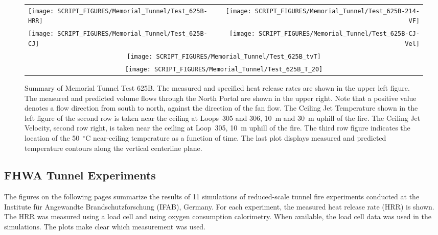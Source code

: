 \begin{figure}[p]
\begin{tabular*}{\textwidth}{l@{\extracolsep{\fill}}r}
\texttt{[image: SCRIPT\_FIGURES/Memorial\_Tunnel/Test\_625B-HRR]} &
\texttt{[image: SCRIPT\_FIGURES/Memorial\_Tunnel/Test\_625B-214-VF]} \\
\texttt{[image: SCRIPT\_FIGURES/Memorial\_Tunnel/Test\_625B-CJ]} &
\texttt{[image: SCRIPT\_FIGURES/Memorial\_Tunnel/Test\_625B-CJ-Vel]} \\
\multicolumn{2}{c}{\texttt{[image: SCRIPT\_FIGURES/Memorial\_Tunnel/Test\_625B\_tvT]}} \\
\multicolumn{2}{c}{\texttt{[image: SCRIPT\_FIGURES/Memorial\_Tunnel/Test\_625B\_T\_20]}}
\end{tabular*}
\caption[Summary of Memorial Tunnel Test 625B]{Summary of Memorial Tunnel Test 625B. The measured and specified heat release rates are shown in the upper left figure. The measured and predicted volume flows through the North Portal are shown in the upper right. Note that a positive value denotes a flow direction from south to north, against the direction of the fan flow. The Ceiling Jet Temperature shown in the left figure of the second row is taken near the ceiling at Loops~305 and 306, 10~m and 30~m uphill of the fire. The Ceiling Jet Velocity, second row right, is taken near the ceiling at Loop~305, 10~m uphill of the fire. The third row figure indicates the location of the 50~$^\circ$C near-ceiling temperature as a function of time. The last plot displays measured and predicted temperature contours along the vertical centerline plane.}
\label{Memorial_Tunnel_625B}
\end{figure}


\clearpage

\subsection{FHWA Tunnel Experiments}
\label{FHWA_Tunnel_Results}

The figures on the following pages summarize the results of 11 simulations of reduced-scale tunnel fire experiments conducted at the Institute f{\"u}r Angewandte Brandschutzforschung (IFAB), Germany. For each experiment, the measured heat release rate (HRR) is shown. The HRR was measured using a load cell and using oxygen consumption calorimetry. When available, the load cell data was used in the simulations. The plots make clear which measurement was used.  

